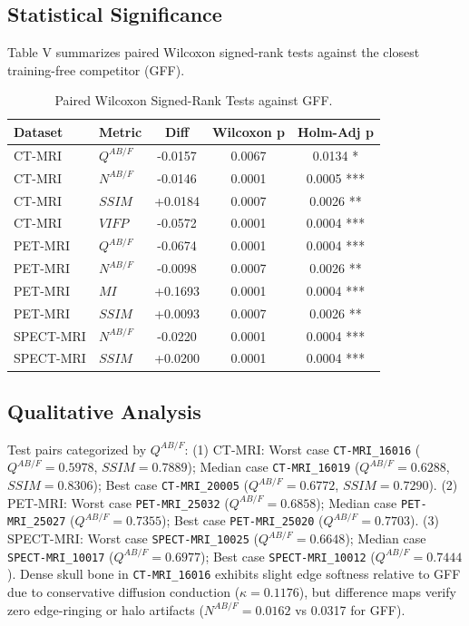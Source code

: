 \documentclass[conference]{IEEEtran}
\begin{document}
\subsection{Statistical Significance}
Table V summarizes paired Wilcoxon signed-rank tests against the closest training-free competitor (GFF).

\begin{table}[htbp]
\caption{Paired Wilcoxon Signed-Rank Tests against GFF.}
\begin{center}
\begin{tabular}{llccc}
\toprule
\textbf{Dataset} & \textbf{Metric} & \textbf{Diff} & \textbf{Wilcoxon p} & \textbf{Holm-Adj p} \\
\midrule
CT-MRI & $Q^{AB/F}$ & -0.0157 & 0.0067 & 0.0134 * \\
CT-MRI & $N^{AB/F}$ & -0.0146 & 0.0001 & 0.0005 *** \\
CT-MRI & $SSIM$ & +0.0184 & 0.0007 & 0.0026 ** \\
CT-MRI & $VIFP$ & -0.0572 & 0.0001 & 0.0004 *** \\
PET-MRI & $Q^{AB/F}$ & -0.0674 & 0.0001 & 0.0004 *** \\
PET-MRI & $N^{AB/F}$ & -0.0098 & 0.0007 & 0.0026 ** \\
PET-MRI & $MI$ & +0.1693 & 0.0001 & 0.0004 *** \\
PET-MRI & $SSIM$ & +0.0093 & 0.0007 & 0.0026 ** \\
SPECT-MRI & $N^{AB/F}$ & -0.0220 & 0.0001 & 0.0004 *** \\
SPECT-MRI & $SSIM$ & +0.0200 & 0.0001 & 0.0004 *** \\
\bottomrule
\end{tabular}
\end{center}
\end{table}

\subsection{Qualitative Analysis}
Test pairs categorized by $Q^{AB/F}$:
(1) CT-MRI: Worst case \texttt{CT-MRI\_16016} ($Q^{AB/F}=0.5978$, $SSIM=0.7889$); Median case \texttt{CT-MRI\_16019} ($Q^{AB/F}=0.6288$, $SSIM=0.8306$); Best case \texttt{CT-MRI\_20005} ($Q^{AB/F}=0.6772$, $SSIM=0.7290$).
(2) PET-MRI: Worst case \texttt{PET-MRI\_25032} ($Q^{AB/F}=0.6858$); Median case \texttt{PET-MRI\_25027} ($Q^{AB/F}=0.7355$); Best case \texttt{PET-MRI\_25020} ($Q^{AB/F}=0.7703$).
(3) SPECT-MRI: Worst case \texttt{SPECT-MRI\_10025} ($Q^{AB/F}=0.6648$); Median case \texttt{SPECT-MRI\_10017} ($Q^{AB/F}=0.6977$); Best case \texttt{SPECT-MRI\_10012} ($Q^{AB/F}=0.7444$).
Dense skull bone in \texttt{CT-MRI\_16016} exhibits slight edge softness relative to GFF due to conservative diffusion conduction ($\kappa=0.1176$), but difference maps verify zero edge-ringing or halo artifacts ($N^{AB/F} = 0.0162$ vs 0.0317 for GFF).
\end{document}
